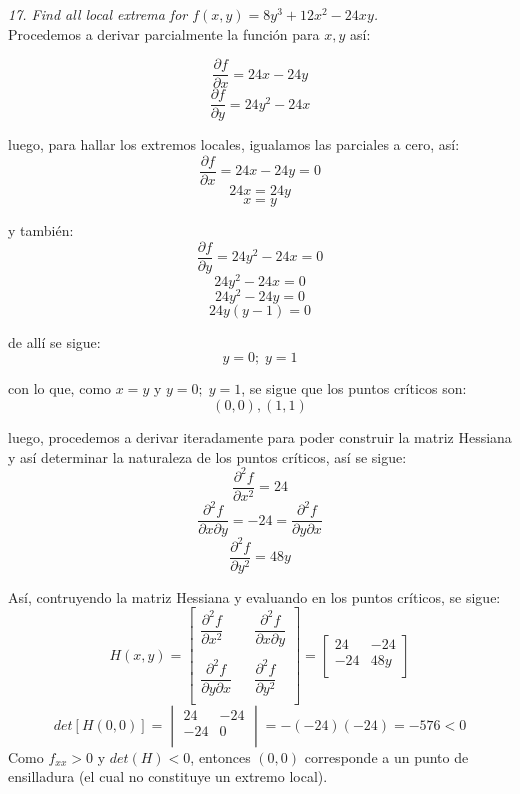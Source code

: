 \documentclass[a4paper,12pt]{article}
\begin{document}
\textit{17. Find all local extrema for $f (x, y) = 8y^3 +12x^2 - 24xy$.}\\

Procedemos a derivar parcialmente la función para $x, y$ así:

	$$ \frac{\partial f}{\partial x} = 24x - 24y$$
	$$ \frac{\partial f}{\partial y} = 24y^2 - 24x$$

luego, para hallar los extremos locales, igualamos las parciales a cero, así:
	$$ \frac{\partial f}{\partial x} = 24x - 24y = 0$$
	$$ 24x = 24y$$
	$$ x = y$$

y también:
	$$ \frac{\partial f}{\partial y} = 24y^2 - 24x = 0$$
	$$ 24y^2 - 24x = 0$$
	$$ 24y^2 - 24y = 0$$
	$$ 24y(y - 1) = 0$$

de allí se sigue:
	$$ y = 0; \; y=1 $$

con lo que, como $x = y$ y $ y = 0; \; y=1 $, se sigue que los puntos críticos
son:
	$$ (0,0), (1,1) $$

luego, procedemos a derivar iteradamente para poder construir la matriz Hessiana
y así determinar la naturaleza de los puntos críticos, así se sigue:
	$$ \frac{\partial^2 f}{\partial x^2} = 24$$
	$$ \frac{\partial^2 f}{\partial x \partial y } = -24
	 = \frac{\partial^2 f}{\partial y \partial x } $$
	$$ \frac{\partial^2 f}{\partial y^2} = 48y$$

Así, contruyendo la matriz Hessiana y evaluando en los puntos críticos, se sigue:
	$$H(x,y) = \begin{bmatrix}
			\dfrac{\partial^2f}{\partial x^2} & & \dfrac{\partial^2f}{\partial x\partial y} \\
			& & \\
			\dfrac{\partial^2f}{\partial y\partial x}&  & \dfrac{\partial^2f}{\partial y^2} \\
			\end{bmatrix} =
			\begin{bmatrix}
				24 & -24 \\
				-24  & 48y \\
			\end{bmatrix}
			$$
	$$det [H (0,0)] =
			\begin{vmatrix}
				24 & -24 \\
				-24  & 0 \\
			\end{vmatrix} = -(-24)(-24) = -576 < 0
	$$
	Como $f_{xx} > 0$ y $det(H) < 0$, entonces $(0,0)$ corresponde a un
	punto de ensilladura (el cual no constituye un extremo local).\\
\end{document}
